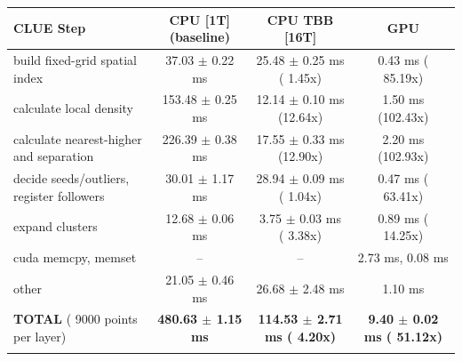     \begin{tabular}{l|c|c|c}
    \hline
    CLUE Step                                 & CPU [1T] (baseline)         & CPU TBB [16T]                         & GPU                       \\ \hline
    build fixed-grid spatial index            &  37.03 $\pm$  0.22 ms       &  25.48 $\pm$  0.25 ms ( 1.45x)        &   0.43 ms ( 85.19x)       \\
    calculate local density                   & 153.48 $\pm$  0.25 ms       &  12.14 $\pm$  0.10 ms (12.64x)        &   1.50 ms (102.43x)       \\
    calculate nearest-higher and separation   & 226.39 $\pm$  0.38 ms       &  17.55 $\pm$  0.33 ms (12.90x)        &   2.20 ms (102.93x)       \\
    decide seeds/outliers, register followers &  30.01 $\pm$  1.17 ms       &  28.94 $\pm$  0.09 ms ( 1.04x)        &   0.47 ms ( 63.41x)       \\
    expand clusters                           &  12.68 $\pm$  0.06 ms       &   3.75 $\pm$  0.03 ms ( 3.38x)        &   0.89 ms ( 14.25x)       \\ \hline
    cuda memcpy, memset                       & --                          & --                                    &   2.73 ms,   0.08 ms      \\
    other                                     &  21.05 $\pm$  0.46 ms       &  26.68 $\pm$  2.48 ms                 &   1.10 ms                 \\ \hline
    \textbf{TOTAL} ( 9000 points per layer)   & \textbf{480.63 $\pm$  1.15 ms} & \textbf{114.53 $\pm$  2.71 ms ( 4.20x)} & \textbf{  9.40 $\pm$  0.02 ms ( 51.12x)}  \\
    \hline
    \multicolumn{4}{c}{}
    \end{tabular}
    \linebreak


